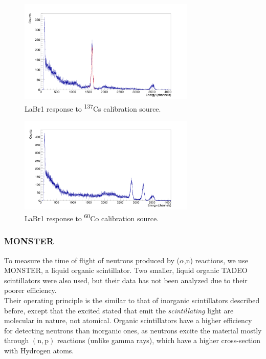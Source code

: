 \documentclass[a4paper,12pt]{report}
\newcommand{\an}{($\alpha$,n) }
\begin{document}
\begin{figure}[H]
	\centering
	\includegraphics[width=0.75\textwidth]{labr_cs137_calibration.png}
	\caption{LaBr1 response to \textsuperscript{137}Cs calibration source.}
	\label{labr_cs137_calibration}
\end{figure}

\begin{figure}[H]
	\centering
	\includegraphics[width=0.75\textwidth]{labr_co60_calibration.png}
	\caption{LaBr1 response to \textsuperscript{60}Co calibration source.}
	\label{labr_co60_calibration}
\end{figure}

\subsubsection{MONSTER}
To measure the time of flight of neutrons produced by \an reactions, we use MONSTER, a liquid organic scintillator.
Two smaller, liquid organic TADEO scintillators were also used, but their data has not been analyzed due to their poorer efficiency.
\\

Their operating principle is the similar to that of inorganic scintillators described before, except that the excited stated that emit the \textit{scintillating} light are molecular in nature, not atomical.
Organic scintillators have a higher efficiency for detecting neutrons than inorganic ones, as neutrons excite the material mostly through $\left( \text{n},\text{p}  \right)$ reactions (unlike gamma rays), which have a higher cross-section with Hydrogen atoms.
\end{document}
